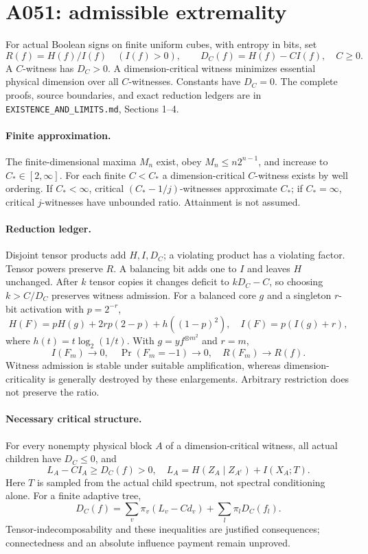 \documentclass{article}
\begin{document}
\section*{A051: admissible extremality}
For actual Boolean signs on finite uniform cubes, with entropy in bits, set
\[R(f)=H(f)/I(f)\quad(I(f)>0),\qquad D_C(f)=H(f)-CI(f),\quad C\geq0.\]
A $C$-witness has $D_C>0$. A dimension-critical witness minimizes essential
physical dimension over all $C$-witnesses. Constants have $D_C=0$.
The complete proofs, source boundaries, and exact reduction ledgers are in
\texttt{EXISTENCE\_AND\_LIMITS.md}, Sections 1--4.

\paragraph{Finite approximation.}
The finite-dimensional maxima $M_n$ exist, obey $M_n\leq n2^{n-1}$,
and increase to $C_*\in[2,\infty]$. For each finite $C<C_*$ a
dimension-critical $C$-witness exists by well ordering. If $C_*<\infty$,
critical $(C_*-1/j)$-witnesses approximate $C_*$; if $C_*=\infty$,
critical $j$-witnesses have unbounded ratio. Attainment is not assumed.

\paragraph{Reduction ledger.}
Disjoint tensor products add $H,I,D_C$; a violating product has a violating
factor. Tensor powers preserve $R$. A balancing bit adds one to $I$ and
leaves $H$ unchanged. After $k$ tensor copies it changes deficit to
$kD_C-C$, so choosing $k>C/D_C$ preserves witness admission.
For a balanced core $g$ and a singleton $r$-bit activation with $p=2^{-r}$,
\[H(F)=pH(g)+2rp(2-p)+h((1-p)^2),\quad I(F)=p(I(g)+r),\]
where $h(t)=t\log_2(1/t)$. With $g=yf^{\otimes m^2}$ and $r=m$,
\[I(F_m)\to0,\quad\Pr(F_m=-1)\to0,\quad R(F_m)\to R(f).\]
Witness admission is stable under suitable amplification, whereas
dimension-criticality is generally destroyed by these enlargements.
Arbitrary restriction does not preserve the ratio.

\paragraph{Necessary critical structure.}
For every nonempty physical block $A$ of a dimension-critical witness,
all actual children have $D_C\leq0$, and
\[L_A-CI_A\geq D_C(f)>0,\quad
L_A=H(Z_A\mid Z_{A^c})+I(X_A;T).\]
Here $T$ is sampled from the actual child spectrum, not spectral
conditioning alone. For a finite adaptive tree,
\[D_C(f)=\sum_v\pi_v(L_v-Cd_v)+\sum_l\pi_lD_C(f_l).\]
Tensor-indecomposability and these inequalities are justified consequences;
connectedness and an absolute influence payment remain unproved.
\end{document}
